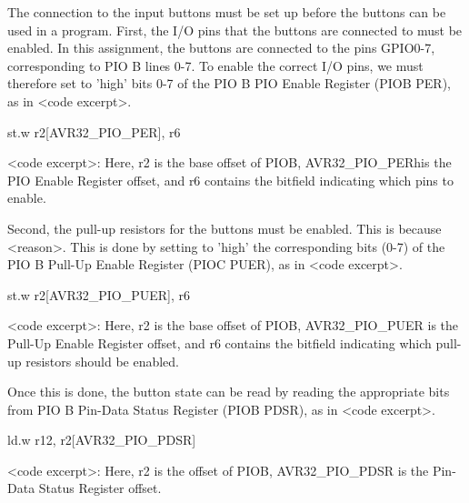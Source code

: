 The connection to the input buttons must be set up before the buttons can be used in a program.
First, the I/O pins that the buttons are connected to must be enabled.
In this assignment, the buttons are connected to the pins GPIO0-7, corresponding to PIO B lines 0-7.
To enable the correct I/O pins, we must therefore set to 'high' bits 0-7 of the PIO B PIO Enable Register (PIOB PER), as in <code excerpt>.

    st.w r2[AVR32_PIO_PER], r6


    <code excerpt>: Here, r2 is the base offset of PIOB, AVR32_PIO_PERhis the PIO Enable Register offset, and r6 contains the bitfield indicating which pins to enable.


Second, the pull-up resistors for the buttons must be enabled. This is because <reason>.
This is done by setting to 'high' the corresponding bits (0-7) of the PIO B Pull-Up Enable Register (PIOC PUER), as in <code excerpt>.

    st.w r2[AVR32_PIO_PUER], r6

    <code excerpt>: Here, r2 is the base offset of PIOB, AVR32_PIO_PUER is the Pull-Up Enable Register offset, and r6 contains the bitfield indicating which pull-up resistors should be enabled.


Once this is done, the button state can be read by reading the appropriate bits from PIO B Pin-Data Status Register (PIOB PDSR), as in <code excerpt>.

    ld.w r12, r2[AVR32_PIO_PDSR]
    
    <code excerpt>: Here, r2 is the offset of PIOB, AVR32_PIO_PDSR is the Pin-Data Status Register offset.

